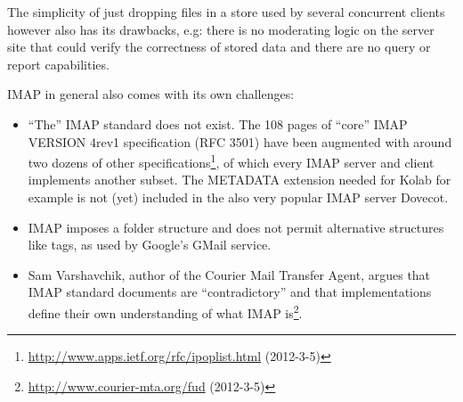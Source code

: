 \documentclass[11pt,a4paper,headsepline,twoside]{scrartcl}		%
\newcommand{\citeurl}[2]{\url{#1} (#2)}
\begin{document}
The simplicity of just dropping files in a store used by several concurrent
clients however also has its drawbacks, e.g: there is no moderating logic on the
server site that could verify the correctness of stored data and there are no
query or report capabilities.

IMAP in general also comes with its own challenges:

\begin{itemize}
\item ``The'' IMAP standard does not exist. The 108 pages of ``core'' IMAP
  VERSION 4rev1 specification (RFC 3501) have been augmented with around two
  dozens of other
  specifications\footnote{\citeurl{http://www.apps.ietf.org/rfc/ipoplist.html}{2012-3-5}},
  of which every IMAP server and client implements another subset. The METADATA
  extension needed for Kolab for example is not (yet) included in the also very
  popular IMAP server Dovecot.
\item IMAP imposes a folder structure and does not permit alternative structures
  like tags, as used by Google's GMail service.
\item Sam Varshavchik, author of the Courier Mail Transfer Agent, argues that
  IMAP standard documents are ``contradictory'' and that implementations define
  their own understanding of what IMAP
  is\footnote{\citeurl{http://www.courier-mta.org/fud}{2012-3-5}}.
\end{itemize}

\end{document}
